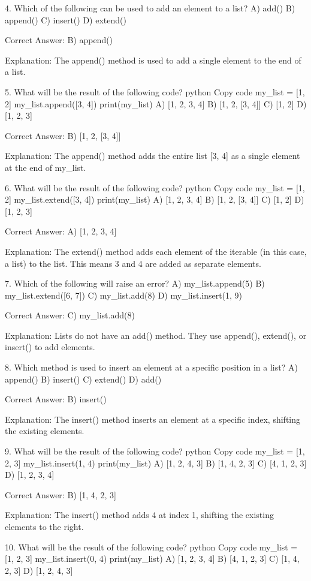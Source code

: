 4. Which of the following can be used to add an element to a list?
A) add()
B) append()
C) insert()
D) extend()

Correct Answer: B) append()

Explanation:
The append() method is used to add a single element to the end of a list.

5. What will be the result of the following code?
python
Copy code
my_list = [1, 2]
my_list.append([3, 4])
print(my_list)
A) [1, 2, 3, 4]
B) [1, 2, [3, 4]]
C) [1, 2]
D) [1, 2, 3]

Correct Answer: B) [1, 2, [3, 4]]

Explanation:
The append() method adds the entire list [3, 4] as a single element at the end of my_list.

6. What will be the result of the following code?
python
Copy code
my_list = [1, 2]
my_list.extend([3, 4])
print(my_list)
A) [1, 2, 3, 4]
B) [1, 2, [3, 4]]
C) [1, 2]
D) [1, 2, 3]

Correct Answer: A) [1, 2, 3, 4]

Explanation:
The extend() method adds each element of the iterable (in this case, a list) to the list. This means 3 and 4 are added as separate elements.

7. Which of the following will raise an error?
A) my_list.append(5)
B) my_list.extend([6, 7])
C) my_list.add(8)
D) my_list.insert(1, 9)

Correct Answer: C) my_list.add(8)

Explanation:
Lists do not have an add() method. They use append(), extend(), or insert() to add elements.

8. Which method is used to insert an element at a specific position in a list?
A) append()
B) insert()
C) extend()
D) add()

Correct Answer: B) insert()

Explanation:
The insert() method inserts an element at a specific index, shifting the existing elements.

9. What will be the result of the following code?
python
Copy code
my_list = [1, 2, 3]
my_list.insert(1, 4)
print(my_list)
A) [1, 2, 4, 3]
B) [1, 4, 2, 3]
C) [4, 1, 2, 3]
D) [1, 2, 3, 4]

Correct Answer: B) [1, 4, 2, 3]

Explanation:
The insert() method adds 4 at index 1, shifting the existing elements to the right.

10. What will be the result of the following code?
python
Copy code
my_list = [1, 2, 3]
my_list.insert(0, 4)
print(my_list)
A) [1, 2, 3, 4]
B) [4, 1, 2, 3]
C) [1, 4, 2, 3]
D) [1, 2, 4, 3]


